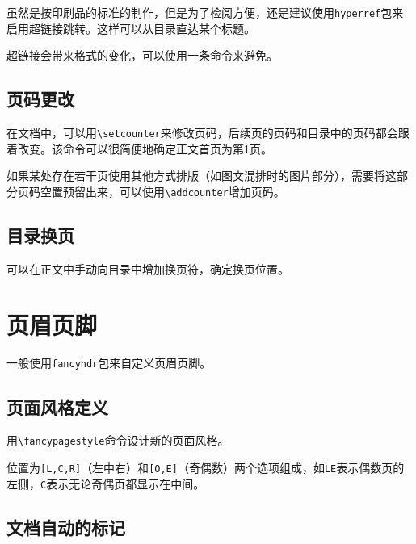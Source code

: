 \documentclass[10pt,openany]{book}
\begin{document}
虽然是按印刷品的标准的制作，但是为了检阅方便，还是建议使用\texttt{hyperref}包来启用超链接跳转。这样可以从目录直达某个标题。

超链接会带来格式的变化，可以使用一条命令来避免。



\section{页码更改}

在文档中，可以用\texttt{\textbackslash{}setcounter}来修改页码，后续页的页码和目录中的页码都会跟着改变。该命令可以很简便地确定正文首页为第1页。



如果某处存在若干页使用其他方式排版（如图文混排时的图片部分），需要将这部分页码空置预留出来，可以使用\texttt{\textbackslash{}addcounter}增加页码。



\section{目录换页}

可以在正文中手动向目录中增加换页符，确定换页位置。



\chapter{页眉页脚}

一般使用\texttt{fancyhdr}包来自定义页眉页脚。

\section{页面风格定义}

用\texttt{\textbackslash{}fancypagestyle}命令设计新的页面风格。



位置为\texttt{[L,C,R]}（左中右）和\texttt{[O,E]}（奇偶数）两个选项组成，如\texttt{LE}表示偶数页的左侧，\texttt{C}表示无论奇偶页都显示在中间。

\section{文档自动的标记}
\end{document}
